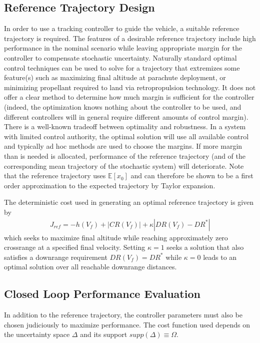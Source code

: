 \documentclass[10pt,a4paper]{article}
\begin{document}
		

	\subsection{Reference Trajectory Design}
	In order to use a tracking controller to guide the vehicle, a suitable reference trajectory is required. The features of a desirable reference trajectory include high performance in the nominal scenario while leaving appropriate margin for the controller to compensate stochastic uncertainty. Naturally standard optimal control techniques can be used to solve for a trajectory that extremizes some feature(s) such as maximizing final altitude at parachute deployment, or minimizing propellant required to land via retropropulsion technology. It does not offer a clear method to determine how much margin is sufficient for the controller (indeed, the optimization knows nothing about the controller to be used, and different controllers will in general require different amounts of control margin). There is a well-known tradeoff between optimality and robustness. In a system with limited control authority, the optimal solution will use all available control and typically ad hoc methods are used to choose the margins. If more margin than is needed is allocated, performance of the reference trajectory (and of the corresponding mean trajectory of the stochastic system) will deteriorate. Note that the reference trajectory uses $ \mathbb{E}[x_0] $ and can therefore be shown to be a first order approximation to the expected trajectory by Taylor expansion.
	
	The deterministic cost used in generating an optimal reference trajectory is given by 
	\begin{align}
	J_{ref} = -h(V_f) + |CR(V_f)| + \kappa|DR(V_f)-DR^*| \label{eq_cost_deterministic}
	\end{align}
	which seeks to maximize final altitude while reaching approximately zero crossrange at a specified final velocity. Setting $\kappa=1$ seeks a solution that also satisfies a downrange requirement $DR(V_f)=DR^*$ while $\kappa=0$ leads to an optimal solution over all reachable downrange distances. 
			
	\subsection{Closed Loop Performance Evaluation}		
	In addition to the reference trajectory, the controller parameters must also be chosen judiciously to maximize performance. The cost function used depends on the uncertainty space $ \Delta $ and its support $supp(\Delta)\equiv\Omega$.		
			
\end{document}

